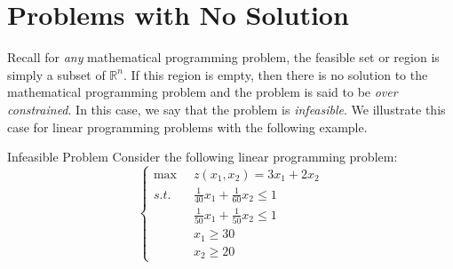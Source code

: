 \section{Problems with No Solution} Recall for \textit{any} mathematical programming problem, the feasible set or region is simply a subset of $\mathbb{R}^n$. If this region is empty, then there is no solution to the mathematical programming problem and the problem is said to be \textit{over constrained}. In this case, we say that the problem is \emph{infeasible}.  We illustrate this case for linear programming problems with the following example.
\begin{example}{Infeasible Problem}
 Consider the following linear programming problem:
\begin{equation}
\left\{
\begin{aligned}
\max\;\;& z(x_1,x_2) = 3x_1 + 2x_2\\
s.t.\;\;&  \frac{1}{40}x_1 + \frac{1}{60}x_2 \leq 1\\
& \frac{1}{50}x_1 + \frac{1}{50}x_2 \leq 1\\
& x_1 \geq 30\\
& x_2 \geq 20
\end{aligned}
\right.
\label{eqn:LPInfeasible}
\end{equation}
\end{example}
